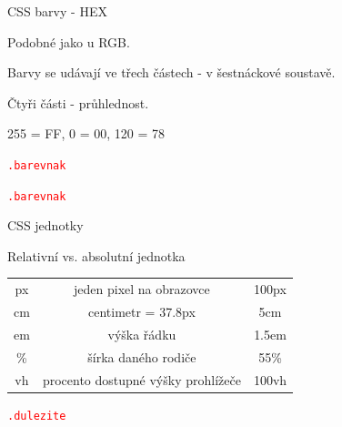 \documentclass[aspectratio=169]{beamer}
\begin{document}
\begin{frame}{CSS barvy - HEX}
    \begin{cardTiny}
        \begin{flushleft}
            Podobné jako u RGB.

            Barvy se udávají ve třech částech - v šestnáckové soustavě.

            Čtyři části - průhlednost.

            255 = FF, 0 = 00, 120 = 78

            \begin{alltt}
                \textcolor{red}{.barevnak} \string{\\
                    \textcolor{blue}{color}: \textcolor{orange}{\#FF0000};\\
                \string}
            \end{alltt}

            \begin{alltt}
                \textcolor{red}{.barevnak} \string{\\
                    \textcolor{blue}{color}: \textcolor{orange}{\#FF7878F0};\\
                \string}
            \end{alltt}
        \end{flushleft}
    \end{cardTiny}
\end{frame}

\begin{frame}{CSS jednotky}
    \begin{cardTiny}
        Relativní vs. absolutní jednotka

        \begin{center}
            \begin{tabular}{ |c|c|c| } 
                \hline
                px & jeden pixel na obrazovce & 100px \\ 
                cm & centimetr = 37.8px & 5cm \\ 
                em & výška řádku & 1.5em \\ 
                \% & šírka daného rodiče & 55\% \\ 
                vh & procento dostupné výšky prohlížeče & 100vh \\ 
                \hline
            \end{tabular}
        \end{center}
    \end{cardTiny}

    \begin{cardTiny}
        \begin{alltt}
            \textcolor{red}{.dulezite} \string{\\
                \textcolor{blue}{font-size}: \textcolor{orange}{5em};\\
            \string}
        \end{alltt}
    \end{cardTiny}
\end{frame}
\end{document}
